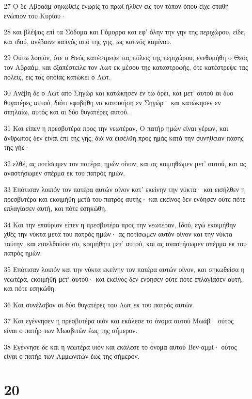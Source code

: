 \par 27 Ο δε Αβραάμ σηκωθείς ενωρίς το πρωΐ ήλθεν εις τον τόπον όπου είχε σταθή ενώπιον του Κυρίου·
\par 28 και βλέψας επί τα Σόδομα και Γόμορρα και εφ' όλην την γην της περιχώρου, είδε, και ιδού, ανέβαινε καπνός από της γης, ως καπνός καμίνου.
\par 29 Ούτω λοιπόν, ότε ο Θεός κατέστρεψε τας πόλεις της περιχώρου, ενεθυμήθη ο Θεός τον Αβραάμ, και εξαπέστειλε τον Λωτ εκ μέσου της καταστροφής, ότε κατέστρεψε τας πόλεις, εις τας οποίας κατώκει ο Λωτ.
\par 30 Ανέβη δε ο Λωτ από Σηγώρ και κατώκησεν εν τω όρει, και μετ' αυτού αι δύο θυγατέρες αυτού, διότι εφοβήθη να κατοικήση εν Σηγώρ· και κατώκησεν εν σπηλαίω, αυτός και αι δύο θυγατέρες αυτού.
\par 31 Και είπεν η πρεσβυτέρα προς την νεωτέραν, Ο πατήρ ημών είναι γέρων, και άνθρωπος δεν είναι επί της γης, διά να εισέλθη προς ημάς κατά την συνήθειαν πάσης της γής·
\par 32 ελθέ, ας ποτίσωμεν τον πατέρα, ημών οίνον, και ας κοιμηθώμεν μετ' αυτού, και ας αναστήσωμεν σπέρμα εκ του πατρός ημών.
\par 33 Επότισαν λοιπόν τον πατέρα αυτών οίνον κατ' εκείνην την νύκτα· και εισήλθεν η πρεσβυτέρα και εκοιμήθη μετά του πατρός αυτής· και εκείνος δεν ενόησεν ούτε πότε επλαγίασεν αυτή, και πότε εσηκώθη.
\par 34 Και την επαύριον είπεν η πρεσβυτέρα προς την νεωτέραν, Ιδού, εγώ εκοιμήθην χθές την νύκτα μετά του πατρός ημών· ας ποτίσωμεν αυτόν οίνον και την νύκτα ταύτην, και εισελθούσα συ, κοιμήθητι μετ' αυτού, και ας αναστήσωμεν σπέρμα εκ του πατρός ημών.
\par 35 Επότισαν λοιπόν και την νύκτα εκείνην τον πατέρα αυτών οίνον, και σηκωθείσα η νεωτέρα, εκοιμήθη μετ' αυτού· και εκείνος δεν ενόησεν ούτε πότε επλαγίασεν αυτή, και πότε εσηκώθη.
\par 36 Και συνέλαβον αι δύο θυγατέρες του Λωτ εκ του πατρός αυτών.
\par 37 Και εγέννησεν η πρεσβυτέρα υιόν και εκάλεσε το όνομα αυτού Μωάβ· ούτος είναι ο πατήρ των Μωαβιτών έως της σήμερον.
\par 38 Εγέννησε δε και η νεωτέρα υιόν και εκάλεσε το όνομα αυτού Βεν-αμμί· ούτος είναι ο πατήρ των Αμμωνιτών έως της σήμερον.

\chapter{20}

